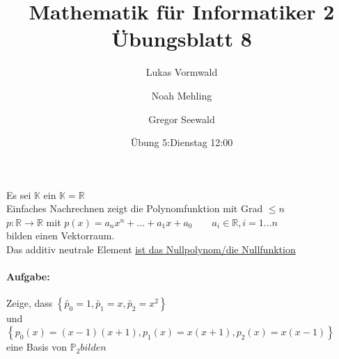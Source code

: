 \documentclass[11pt,a4paper]{article}
\title{Mathematik für Informatiker 2\\Übungsblatt 8}
\author{Lukas Vormwald \and Noah Mehling \and Gregor Seewald}
\date{Übung 5:Dienstag 12:00}
\begin{document}
  Es sei $\mathbb{K}$ ein $\mathbb{K}=\mathbb{R}$\\
  Einfaches Nachrechnen zeigt die Polynomfunktion mit Grad $\leq n$\\
  $p:\mathbb{R}\to\mathbb{R}$ mit $p(x)=a_nx^n+...+a_1x+a_0\qquad a_i\in\mathbb{R},i=1...n$\\
  bilden einen Vektorraum.\\
  Das additiv neutrale Element \underline{ist das Nullpolynom/die Nullfunktion}\\
  \paragraph{Aufgabe:}
    Zeige, dass $\left\lbrace \tilde{p_0}=1,\tilde{p_1}=x,\tilde{p_2}=x^2\right\rbrace$\\
    und\\
    $\left\lbrace p_0(x)=(x-1)(x+1),p_1(x)=x(x+1),p_2(x)=x(x-1)\right\rbrace$\\
    eine Basis von $\mathbb{P}_2 bilden$\\
\end{document}
